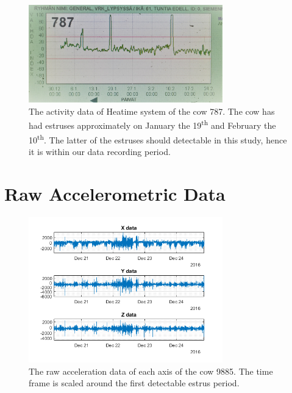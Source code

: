 \begin{figure}[h]
\centering
\includegraphics[width = 0.75\textwidth]{figures/heatime_kiima_787}
\caption{The activity data of Heatime system of the cow 787. The cow has had estruses approximately on January the 19\textsuperscript{th} and February the 10\textsuperscript{th}. The latter of the estruses should detectable in this study, hence it is within our data recording period.}
\label{heatime_kiima_787}
\end{figure}



\clearpage
\section{Raw Accelerometric Data}

\begin{figure}[h]
\centering
\includegraphics[width = 0.75\textwidth]{figures/kiimadata_9885_1.png}
\caption{The raw acceleration data of each axis of the cow 9885. The time frame is scaled around the first detectable estrus period. }
\label{kiimadata_9885_1}
\end{figure}

